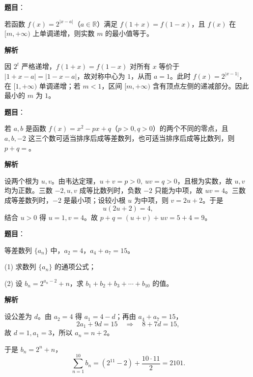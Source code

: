 \begin{answer}

\textbf{题目}：

若函数 \(f(x)=2^{|x-a|}\)（\(a\in\mathbb R\)）满足 \(f(1+x)=f(1-x)\)，且 \(f(x)\) 在 \([m,+\infty)\) 上单调递增，则实数 \(m\) 的最小值等于\gkblank{}。

\textbf{解析}

因 \(2^t\) 严格递增，\(f(1+x)=f(1-x)\) 对所有 \(x\) 等价于 \(|1+x-a|=|1-x-a|\)，故对称中心为 \(1\)，从而 \(a=1\)。此时 \(f(x)=2^{|x-1|}\)，在 \([1,+\infty)\) 单调递增；若 \(m<1\)，区间 \([m,+\infty)\) 含有顶点左侧的递减部分。因此最小的 \(m\) 为 \(1\)。


\end{answer}
\begin{answer}

\textbf{题目}：

若 \(a,b\) 是函数 \(f(x)=x^2-px+q\)（\(p>0,q>0\)）的两个不同的零点，且 \(a,b,-2\) 这三个数可适当排序后成等差数列，也可适当排序后成等比数列，则 \(p+q=\)\gkblank{}。

\textbf{解析}

设两个根为 \(u,v\)。由韦达定理，\(u+v=p>0,\ uv=q>0\)，且根为实数，故 \(u,v\) 均为正数。三数 \(-2,u,v\) 成等比数列时，负数 \(-2\) 只能为中项，故 \(uv=4\)。三数成等差数列时，\(-2\) 是最小项；设较小根 \(u\) 为中项，则 \(v=2u+2\)。于是
\nopagebreak[4]
\[
u(2u+2)=4,
\]
结合 \(u>0\) 得 \(u=1,v=4\)。故 \(p+q=(u+v)+uv=5+4=9\)。


\end{answer}
\begin{answer}

\textbf{题目}：

等差数列 \(\{a_n\}\) 中，\(a_2=4\)，\(a_4+a_7=15\)。

(1) 求数列 \(\{a_n\}\) 的通项公式；

(2) 设 \(b_n=2^{a_n-2}+n\)，求 \(b_1+b_2+b_3+\cdots+b_{10}\) 的值。

\textbf{解析}


设公差为 \(d\)。由 \(a_2=4\) 得 \(a_1=4-d\)；再由 \(a_4+a_7=15\)，
\nopagebreak[4]
\[
2a_1+9d=15\quad\Longrightarrow\quad8+7d=15,
\]
故 \(d=1,a_1=3\)，所以 \(a_n=n+2\)。


于是 \(b_n=2^n+n\)，
\nopagebreak[4]
\[
\sum_{n=1}^{10}b_n=(2^{11}-2)+\frac{10\cdot11}{2}=2101.
\]



\end{answer}
